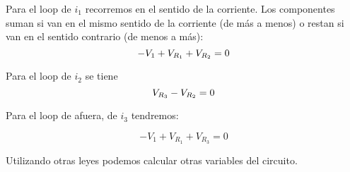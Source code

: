 \begin{example}
        Para el loop de $i_1$ recorremos en el sentido de la corriente. Los componentes suman si van en el mismo sentido de la corriente (de más a menos) o restan si van en el sentido contrario (de menos a más):
        \begin{equation*}
        \notag -V_{1} + V_{R_1} + V_{R_2}  = 0
        \end{equation*}


        Para el loop de $i_2$ se tiene
        \begin{equation*}
        \notag V_{R_3} - V_{R_2} = 0
        \end{equation*}

        Para el loop de afuera, de $i_3$ tendremos:

        \begin{equation*}
        -V_1 + V_{R_1} + V_{R_3} =0
        \end{equation*}

        Utilizando otras leyes podemos calcular otras variables del circuito.

    \end{example}
\fi

